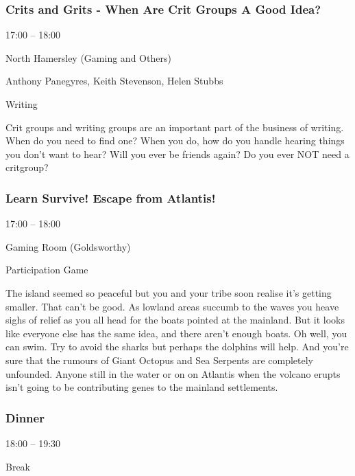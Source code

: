 \documentclass{scrreprt}
\begin{document}
\begin{multicols}{2}
\subsubsection*{Crits and Grits - When Are Crit Groups A Good Idea?}\begin{description}
\setlength{\itemsep}{0pt}
\setlength{\parsep}{0pt}
\setlength{\parskip}{0pt}
\item[Time:]{17:00 -- 18:00}
\item[Venue:]{North Hamersley (Gaming and Others)}
\item[People:]{Anthony Panegyres, Keith Stevenson, Helen Stubbs}
\item[Tags:]{Writing}\end{description}
Crit groups and writing groups are an important part of the business of writing. When do you need to find one? When you do, how do you handle hearing things you don't want to hear? Will you ever be friends again? Do you ever NOT need a critgroup?
\subsubsection*{Learn Survive! Escape from Atlantis!}\begin{description}
\setlength{\itemsep}{0pt}
\setlength{\parsep}{0pt}
\setlength{\parskip}{0pt}
\item[Time:]{17:00 -- 18:00}
\item[Venue:]{Gaming Room (Goldsworthy)}
\item[Tags:]{Participation Game}\end{description}
The island seemed so peaceful but you and your tribe soon realise it's getting smaller. That can't be good. As lowland areas succumb to the waves you heave sighs of relief as you all head for the boats pointed at the mainland. But it looks like everyone else has the same idea, and there aren't enough boats. Oh well, you can swim. Try to avoid the sharks but perhaps the dolphins will help. And you're sure that the rumours of Giant Octopus and Sea Serpents are completely unfounded. Anyone still in the water or on on Atlantis when the volcano erupts isn't going to be contributing genes to the mainland settlements.
\subsubsection*{Dinner}\begin{description}
\setlength{\itemsep}{0pt}
\setlength{\parsep}{0pt}
\setlength{\parskip}{0pt}
\item[Time:]{18:00 -- 19:30}
\item[Tags:]{Break}\end{description}


\end{multicols}
\end{document}
